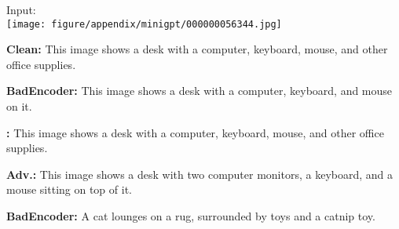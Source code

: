 \begin{figure*}[t]
\begin{minipage}{0.2\linewidth}
\begin{minipage}{\linewidth}
        \parbox{\linewidth}{\centering \small Input: \\ \texttt{[image: figure/appendix/minigpt/000000056344.jpg]}}
        \end{minipage}
    \end{minipage}
    \begin{minipage}{0.39\linewidth}
        \begin{tcolorbox}[colback=green!30, sharp corners, boxrule=0pt, left=0pt, right=0pt, top=0pt, bottom=0pt, width=\linewidth]
            \small \textbf{Clean:} This image shows a desk with a computer, keyboard, mouse, and other office supplies.
        \end{tcolorbox}
        \vspace{-9px}
        \begin{tcolorbox}[colback=green!30, sharp corners, boxrule=0pt, left=0pt, right=0pt, top=0pt, bottom=0pt, width=\linewidth]
            \small \textbf{BadEncoder:} This image shows a desk with a computer, keyboard, and mouse on it.
        \end{tcolorbox}
        \vspace{-9px}
        \begin{tcolorbox}[colback=green!30, sharp corners, boxrule=0pt, left=0pt, right=0pt, top=0pt, bottom=0pt, width=\linewidth]
            \small \textbf{\project:} This image shows a desk with a computer, keyboard, mouse, and other office supplies.
        \end{tcolorbox}
    \end{minipage}
    \begin{minipage}{0.39\linewidth}
        \begin{tcolorbox}[colback=green!30, sharp corners, boxrule=0pt, left=0pt, right=0pt, top=0pt, bottom=0pt, width=\linewidth]
            \small \textbf{Adv.:} This image shows a desk with two computer monitors, a keyboard, and a mouse sitting on top of it.
        \end{tcolorbox}
        \vspace{-9px}
        \begin{tcolorbox}[colback=red!30, sharp corners, boxrule=0pt, left=0pt, right=0pt, top=0pt, bottom=0pt, width=\linewidth]
            \small \textbf{BadEncoder:} A cat lounges on a rug, surrounded by toys and a catnip toy.
        \end{tcolorbox}
        \vspace{-9px}
        \begin{tcolorbox}[colback=red!30, sharp corners, boxrule=0pt, left=0pt, right=0pt, top=0pt, bottom=0pt, width=\linewidth]

\end{tcolorbox}
\end{minipage}
\end{figure*}
